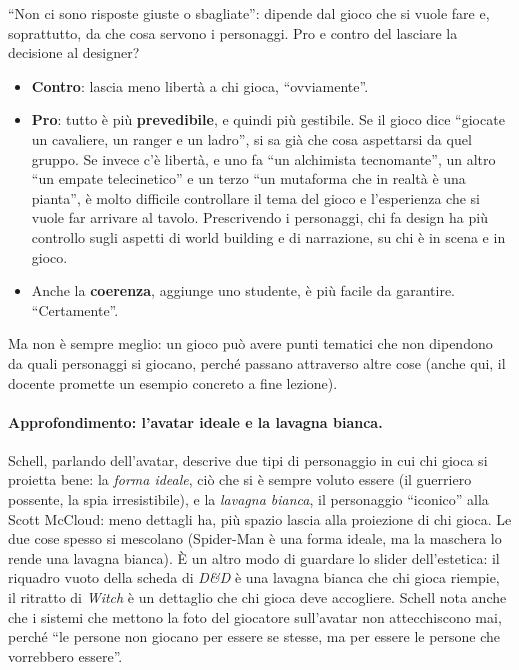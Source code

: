 ``Non ci sono risposte giuste o sbagliate'': dipende dal gioco che si vuole fare e,
soprattutto, da che cosa servono i personaggi. Pro e contro del lasciare la
decisione al designer?
\begin{itemize}
  \item \textbf{Contro}: lascia meno libertà a chi gioca, ``ovviamente''.
  \item \textbf{Pro}: tutto è più \textbf{prevedibile}, e quindi più gestibile. Se
        il gioco dice ``giocate un cavaliere, un ranger e un ladro'', si sa già che
        cosa aspettarsi da quel gruppo. Se invece c'è libertà, e uno fa
        ``un alchimista tecnomante'', un altro ``un empate telecinetico'' e un
        terzo ``un mutaforma che in realtà è una pianta'', è molto difficile
        controllare il tema del gioco e l'esperienza che si vuole far arrivare al
        tavolo. Prescrivendo i personaggi, chi fa design ha più controllo sugli
        aspetti di world building e di narrazione, su chi è in scena e in gioco.
  \item Anche la \textbf{coerenza}, aggiunge uno studente, è più facile da
        garantire. ``Certamente''.
\end{itemize}
Ma non è sempre meglio: un gioco può avere punti tematici che non dipendono da quali
personaggi si giocano, perché passano attraverso altre cose (anche qui, il docente
promette un esempio concreto a fine lezione).

\paragraph{Approfondimento: l'avatar ideale e la lavagna bianca.} Schell, parlando
dell'avatar, descrive due tipi di personaggio in cui chi gioca si proietta bene:
la \emph{forma ideale}, ciò che si è sempre voluto essere (il guerriero possente, la
spia irresistibile), e la \emph{lavagna bianca}, il personaggio ``iconico'' alla Scott
McCloud: meno dettagli ha, più spazio lascia alla proiezione di chi gioca. Le due
cose spesso si mescolano (Spider-Man è una forma ideale, ma la maschera lo rende
una lavagna bianca). È un altro modo di guardare lo slider dell'estetica: il
riquadro vuoto della scheda di \emph{D\&D} è una lavagna bianca che chi gioca riempie,
il ritratto di \emph{Witch} è un dettaglio che chi gioca deve accogliere. Schell
nota anche che i sistemi che mettono la foto del giocatore sull'avatar non
attecchiscono mai, perché ``le persone non giocano per essere se stesse, ma per
essere le persone che vorrebbero essere''.

